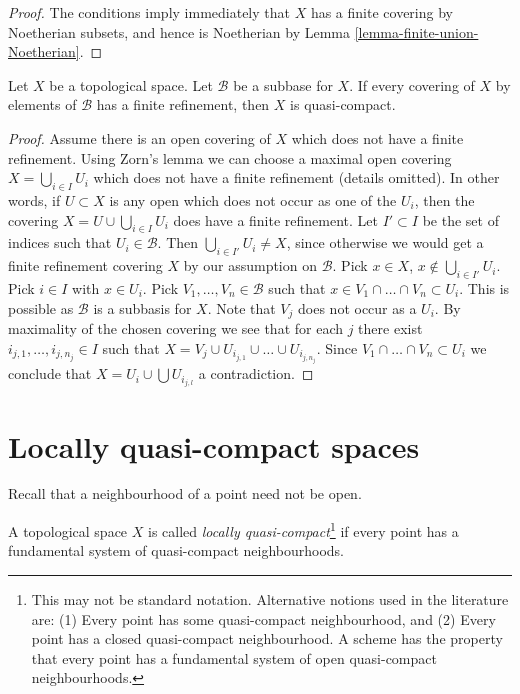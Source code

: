 \begin{proof}
The conditions imply immediately that $X$ has a finite covering by
Noetherian subsets, and hence is Noetherian by
Lemma \ref{lemma-finite-union-Noetherian}.
\end{proof}

\begin{lemma}
\label{lemma-subbase-theorem}
Let $X$ be a topological space. Let $\mathcal{B}$ be a subbase for $X$.
If every covering of $X$ by elements of $\mathcal{B}$ has a finite
refinement, then $X$ is quasi-compact.
\end{lemma}

\begin{proof}
Assume there is an open covering of $X$ which does not have a finite
refinement. Using Zorn's lemma we can choose a maximal open covering
$X = \bigcup_{i \in I} U_i$ which does not have a finite refinement
(details omitted).
In other words, if $U \subset X$ is any open which does not occur as
one of the $U_i$, then the covering $X = U \cup \bigcup_{i \in I} U_i$
does have a finite refinement. Let $I' \subset I$ be the set of indices
such that $U_i \in \mathcal{B}$. Then $\bigcup_{i \in I'} U_i \not = X$,
since otherwise we would get a finite refinement covering $X$ by our
assumption on $\mathcal{B}$. Pick $x \in X$,
$x \not \in \bigcup_{i \in I'} U_i$. Pick $i \in I$ with $x \in U_i$.
Pick $V_1, \ldots, V_n \in \mathcal{B}$ such that
$x \in V_1 \cap \ldots \cap V_n \subset U_i$. This is
possible as $\mathcal{B}$ is a subbasis for $X$. Note that
$V_j$ does not occur as a $U_i$. By maximality of the chosen
covering we see that for each $j$ there exist
$i_{j, 1}, \ldots, i_{j, n_j} \in I$ such that
$X = V_j \cup U_{i_{j, 1}} \cup \ldots \cup U_{i_{j, n_j}}$.
Since $V_1 \cap \ldots \cap V_n \subset U_i$ we conclude that
$X = U_i \cup \bigcup U_{i_{j, l}}$ a contradiction.
\end{proof}






\section{Locally quasi-compact spaces}
\label{section-locally-quasi-compact}

\noindent
Recall that a neighbourhood of a point need not be open.

\begin{definition}
\label{definition-locally-quasi-compact}
A topological space $X$ is called
{\it locally quasi-compact}\footnote{This may not be standard notation.
Alternative notions used in the literature are: (1) Every point has some
quasi-compact neighbourhood, and (2) Every point has a closed quasi-compact
neighbourhood. A scheme has the property that every point has a fundamental
system of open quasi-compact neighbourhoods.} if every
point has a fundamental system of quasi-compact neighbourhoods.
\end{definition}

